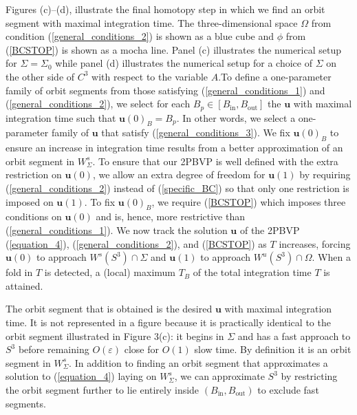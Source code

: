 \documentclass{ws-ijbc}
\begin{document}
Figures (c)--(d), illustrate the final homotopy step in which we find an orbit segment with maximal integration time.  The three-dimensional space $\Omega$ from condition (\ref{general_conditions_2}) is shown as a blue cube and $\phi$ from (\ref{BCSTOP}) is shown as a mocha line.  Panel (c) illustrates the numerical setup for $\Sigma=\Sigma_0$ while panel (d) illustrates the numerical setup for a choice of $\Sigma$ on the other side of $C^3$ with respect to the variable $A$.To define a one-parameter family of orbit segments from those satisfying (\ref{general_conditions_1}) and (\ref{general_conditions_2}), we select for each $B_p \in [B_{\text{in}}, B_{\text{out}}]$ the $\mathbf{u}$ with maximal integration time such that $\mathbf{u}(0)_B=B_p$.  In other words, we select a one-parameter family of $\mathbf{u}$ that satisfy (\ref{general_conditions_3}).  We fix $\mathbf{u}(0)_B$ to ensure an increase in integration time results from a better approximation of an orbit segment in $W^s_\Sigma$.  To ensure that our 2PBVP is well defined with the extra restriction on $\mathbf{u}(0)$, we allow an extra degree of freedom for $\mathbf{u}(1)$ by requiring (\ref{general_conditions_2}) instead of (\ref{specific_BC}) so that only one restriction is imposed on $\mathbf{u}(1)$. To fix $\mathbf{u}(0)_B$, we require (\ref{BCSTOP}) which imposes three conditions on $\mathbf{u}(0)$ and is, hence, more restrictive than (\ref{general_conditions_1}).  We now track the solution $\mathbf{u}$ of the 2PBVP (\ref{equation_4}), (\ref{general_conditions_2}), and (\ref{BCSTOP}) as $T$ increases, forcing $\mathbf{u}(0)$ to approach $W^s(S^3)\cap\Sigma$ and $\mathbf{u}(1)$ to approach $W^u(S^3) \cap \Omega$. When a fold in $T$ is detected, a (local) maximum $T_B$ of the total integration time $T$ is attained.

The orbit segment that is obtained is the desired $\mathbf{u}$ with maximal integration time.  It is not represented in a figure because it is practically identical to the orbit segment illustrated in Figure 3(c): it begins in $\Sigma$ and has a fast approach to $S^3$ before remaining $O(\varepsilon)$ close for $O(1)$ slow time.  By definition it is an orbit segment in $W^{s}_{\Sigma}$.  In addition to finding an orbit segment that approximates a solution to (\ref{equation_4}) laying on $W^s_{\Sigma}$, we can approximate $S^3$ by restricting the orbit segment further to lie entirely inside $(B_{\text{in}},B_{\text{out}})$ to exclude fast segments.
\end{document}
